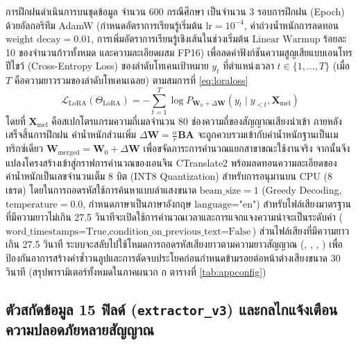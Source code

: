 การฝึกฝนดำเนินการบนชุดข้อมูล  จำนวน 600 กรณีศึกษา เป็นจำนวน 3 รอบการฝึกฝน (Epoch) ด้วยอัลกอริทึม AdamW (กำหนดอัตราการเรียนรู้เริ่มต้น $\mathrm{lr} = 10^{-4}$, ค่าถ่วงน้ำหนักการลดทอน $\text{weight decay} = 0.01$, การเพิ่มอัตราการเรียนรู้เชิงเส้นในช่วงเริ่มต้น $\text{Linear Warmup}$ ร้อยละ 10 ของจำนวนก้าวทั้งหมด และความละเอียดผสม FP16) เพื่อลดค่าฟังก์ชันความสูญเสียแบบเอนโทรปีไขว้ (Cross-Entropy Loss) ของลำดับโทเคนเป้าหมาย $y_t$ ที่ตำแหน่งเวลา $t \in \{1, \dots, T\}$ (เมื่อ $T$ คือความยาวรวมของลำดับโทเคนเฉลย) ตามสมการที่ \eqref{eq:loraloss}
\begin{equation}
\mathcal{L}_{\mathrm{LoRA}}(\Theta_{\mathrm{LoRA}}) = -\sum_{t=1}^{T} \log P_{\mathbf{W}_0 + \Delta \mathbf{W}}\!\left(y_t \mid y_{<t}, \mathbf{X}_{\mathrm{mel}}\right)
\label{eq:loraloss}
\end{equation}
โดยที่ $\mathbf{X}_{\mathrm{mel}}$ คือสเปกโตรแกรมความถี่เมลจำนวน 80 ช่องความถี่ของสัญญาณเสียงนำเข้า ภายหลังเสร็จสิ้นการฝึกฝน ค่าน้ำหนักส่วนเพิ่ม $\Delta \mathbf{W} = \frac{\alpha}{r}\mathbf{B}\mathbf{A}$ จะถูกควบรวมเข้ากับค่าน้ำหนักฐานเป็นเมทริกซ์เดียว $\mathbf{W}_{\mathrm{merged}} = \mathbf{W}_0 + \Delta \mathbf{W}$ เพื่อขจัดภาระการคำนวณแยกสาขาขณะใช้งานจริง จากนั้นจึงแปลงโครงสร้างเข้าสู่กราฟการคำนวณของเอนจิน CTranslate2 \cite{ctranslate2,fasterwhisper} พร้อมลดทอนความละเอียดของค่าน้ำหนักเป็นเลขจำนวนเต็ม 8 บิต (INT8 Quantization) \cite{jacob2018quantization} สำหรับการอนุมานบน CPU (8 เธรด) โดยในการถอดรหัสใช้การค้นหาแบบลำแสงขนาด $\text{beam\_size} = 1$ (Greedy Decoding, $\text{temperature} = 0.0$, กำหนดภาษาเป็นภาษาอังกฤษ $\text{language="en"}$) สำหรับไฟล์เสียงมาตรฐานที่มีความยาวไม่เกิน 27.5 วินาทีจะเปิดใช้การคำนวณเวลาและการแจกแจงความน่าจะเป็นระดับคำ ($\text{word\_timestamps=True}, \text{condition\_on\_previous\_text=False}$) ส่วนไฟล์เสียงที่มีความยาวเกิน 27.5 วินาที ระบบจะสลับไปใช้โหมดการถอดรหัสเสียงยาวตามความยาวสัญญาณ (, , , ) เพื่อป้องกันอาการสร้างคำซ้ำวนลูปและการตัดจบประโยคก่อนกำหนดข้ามรอยต่อหน้าต่างเสียงขนาด 30 วินาที (สรุปพารามิเตอร์ทั้งหมดในภาคผนวก ก ตารางที่ \ref{tab:appconfig})

\subsection{ตัวสกัดข้อมูล 15 ฟิลด์ (\texttt{extractor\_v3}) และกลไกแจ้งเตือนความปลอดภัยหลายสัญญาณ}
\label{sec:extractor_safety}

